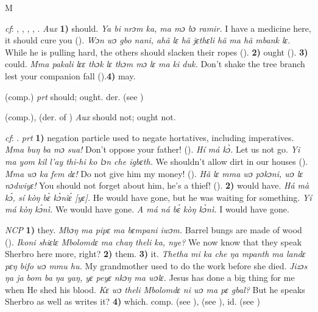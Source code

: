 
\begin{letter}{M}

 \textit{cf}: , , , , . \textit{Aux} \textbf{1)} should. \textit{Ya bi nrɔm ka, ma mɔ bɔ ramir.} I have a medicine here, it should cure you (\citealt{Pichl1967}). \textit{Wɔn wɔ gbo nani, ahã lɛ hã jɛthɛli hã ma hã mbank lɛ.} While he is pulling hard, the others should slacken their ropes (\citealt{Pichl1967}). \textbf{2)} ought (\citealt{Sumner1921}). \textbf{3)} could. \textit{Mma pakali lɛɛ thɔk lɛ thɔm mɔ lɛ ma ki duk.} Don't shake the tree branch lest your companion fall (\citealt{Pichl1967}).\textbf{4)} may.

 (comp.) \textit{prt} should; ought. der.  (see )

 (comp.), (der. of ) \textit{Aux} should not; ought not.

 \textit{cf}: . \textit{prt} \textbf{1)} negation particle used to negate hortatives, including imperatives. \textit{Mma buŋ ba mɔ sua!} Don't oppose your father! (\citealt{Pichl1967}). \textit{Hí má kɔ̀.} Let us not go. \textit{Yi ma yom kil l'ay thi-hi ko lɔn che igbɛth.} We shouldn't allow dirt in our houses (\citealt{Pichl1967}). \textit{Mma wɔ ka fem dɛ!} Do not give him my money! (\citealt{Pichl1967}). \textit{Hã lɛ mma wɔ pɔkɔni, wɔ lɛ nɔdwiyɛ!} You should not forget about him, he's a thief! (\citealt{Pichl1967}). \textbf{2)} would have. \textit{Há mà kɔ́‚ sí kòŋ bɛ̀ kɔ̀nìɛ́ [yɛ].} He would have gone‚ but he was waiting for something. \textit{Yí má kòŋ kɔ́nì.} We would have gone. \textit{A má ná bɛ́ kòŋ kɔ̀nì.} I would have gone.

 \textit{NCP} \textbf{1)} they. \textit{Mbɔŋ ma pipɛ ma bɛmpani iwɔm.} Barrel bungs are made of wood (\citealt{Pichl1967}). \textit{Ikoni shiɛlɛ Mbolomdɛ ma chaŋ theli ka, nye?} We now know that they speak Sherbro here more, right? \textbf{2)} them. \textbf{3)} it. \textit{Thetha mi ka che ŋa mpanth ma landɛ pɛŋ bifo wɔ mmu hu.} My grandmother used to do the work before she died. \textit{Jizɔs ŋa ja bom ba ŋa yaŋ, yɛ peyɛ nkɔŋ ma wɔlɛ.} Jesus has done a big thing for me when He shed his blood. \textit{Kɛ wɔ theli Mbolomdɛ ni wɔ ma pɛ gbal?} But he speaks Sherbro as well as writes it? \textbf{4)} which. comp.  (see ),  (see ), id.  (see ) 


\end{letter}
